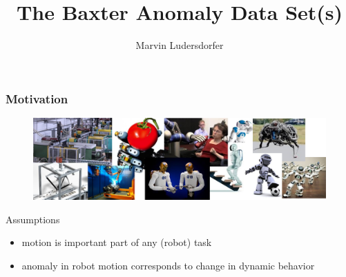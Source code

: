 \documentclass{beamer}
\title{The Baxter Anomaly Data Set(s)}
\author{Marvin Ludersdorfer}
\institute{fortiss and Technische Universit\"{a}t M\"{u}nchen}
\date{}
\begin{document}
    \frame{\titlepage}

    \begin{frame}
    	\frametitle{Motivation}
        \begin{figure}
            \centering
            \includegraphics[width=\textwidth]{figs/robots}
        \end{figure}
        
        \vfill
        \begin{block}{Assumptions}
            \begin{itemize}
                \item motion is important part of any (robot) task
                \item<2-> anomaly in robot motion corresponds to change in dynamic behavior
            \end{itemize}
    	\end{block}
    \end{frame}
\end{document}
